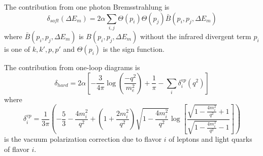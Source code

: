 The contribution from one photon Bremsstrahlung is
\begin{equation}
    \delta_{soft}(\Delta E_m) = 2\alpha \sum_{i,j} \Theta(p_i) \Theta(p_j)
                                                   \bar{B}(p_i,p_j,\Delta E_m)
\end{equation}
where $\bar{B}(p_i,p_j,\Delta E_m)$ is $B(p_i,p_j,\Delta E_m)$ without the
infrared divergent term
$p_i$ is one of $k,k',p,p'$
and
$\Theta(p_i)$ is the sign function.

The contribution from one-loop diagrams is
\begin{equation}
    \delta_{hard} = 2\alpha
                    \left[
                        -\frac{3}{4\pi}\log\left(\frac{-q^2}{m_e^2}\right)
                        + \frac{1}{\pi}
                        - \sum_i \delta^{vp}_i(q^2)
                    \right]
\end{equation}
where
\begin{equation}
    \delta^{vp}_i = \frac{1}{3 \pi}
                        \left(
                            -\frac{5}{3} - \frac{4 m_{i}^{2}}{q^{2}} +
                            \left(1+\frac{2 m_{i}^{2}}{q^{2}}\right)
                            \sqrt{1-\frac{4 m_{i}^{2}}{q^{2}}}
                            \log \left[\frac{\sqrt{1-\frac{4 m_{i}^{2}}{q^{2}}}+1}
                                            {\sqrt{1-\frac{4 m_{i}^{2}}{q^{2}}}-1}
                                 \right]
                        \right)
\end{equation}
is the vacuum polarization correction due to flavor $i$ of leptons and light quarks of flavor $i$.

